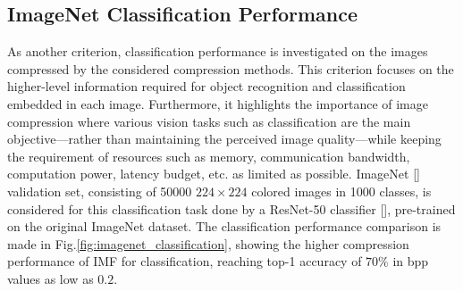 \subsection{ImageNet Classification Performance} \label{sec: imagenet Classification Performance}
As another criterion, classification performance is investigated on the images compressed by the considered compression methods.
This criterion focuses on the higher-level information required for object recognition and classification embedded in each image.
Furthermore, it highlights the importance of image compression where various vision tasks such as classification are the main objective---rather than maintaining the perceived image quality---while keeping the requirement of resources such as memory, communication bandwidth, computation power, latency budget, etc. as limited as possible.
ImageNet [] validation set, consisting of 50000 $224 \times 224$ colored images in 1000 classes, is considered for this classification task done by a ResNet-50 classifier [], pre-trained on the original ImageNet dataset.
The classification performance comparison is made in Fig.\ref{fig:imagenet_classification}, showing the higher compression performance of IMF for classification, reaching top-1 accuracy of $70\%$ in bpp values as low as $0.2$. 

